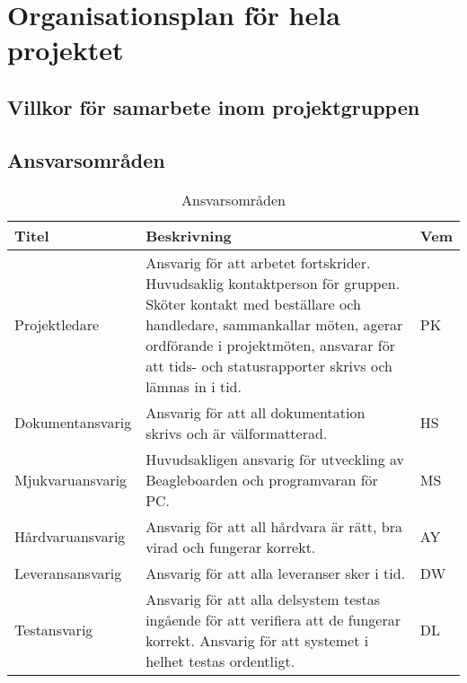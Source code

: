 \section{Organisationsplan för hela projektet}


\subsection{Villkor för samarbete inom projektgruppen}


\subsection{Ansvarsområden}
\begin{table}[h]
	\centering
		\begin{tabularx}{\textwidth}{| l | X | l |}
			\hline
			\textbf{Titel} & \textbf{Beskrivning} & \textbf{Vem} \\
			\hline
			{Projektledare} & {Ansvarig för att arbetet fortskrider. Huvudsaklig kontaktperson för gruppen. Sköter kontakt med beställare och handledare, sammankallar möten, agerar ordförande i projektmöten, ansvarar för att tids- och statusrapporter skrivs och lämnas in i tid.} & {PK} \\\hline
			{Dokumentansvarig} & {Ansvarig för att all dokumentation skrivs och är välformatterad.} & {HS} \\\hline
			{Mjukvaruansvarig} & {Huvudsakligen ansvarig för utveckling av Beagleboarden och programvaran för PC.} & {MS} \\\hline
			{Hårdvaruansvarig} & {Ansvarig för att all hårdvara är rätt, bra virad och fungerar korrekt.} & {AY} \\\hline
			{Leveransansvarig} & {Ansvarig för att alla leveranser sker i tid.} & {DW} \\\hline
			{Testansvarig} & {Ansvarig för att alla delsystem testas ingående för att verifiera att de fungerar korrekt. Ansvarig för att systemet i helhet testas ordentligt.} & {DL} \\\hline
		\end{tabularx}
	\caption{Ansvarsområden} \label{dokumentation:tabell}
\end{table}

